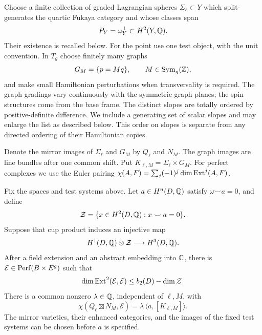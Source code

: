 Choose a finite collection of graded Lagrangian spheres $\Sigma_\ell\subset Y$
which split-generates the quartic Fukaya category and whose classes span
\begin{equation}
 P_Y=\omega_Y^\perp\subset H^2(Y,\mathbb Q).
 \label{setup:primitive-space}
\end{equation}
Their existence is recalled below.  For the point use one test object,
with the unit convention.  In $T_g$ choose finitely many graphs
\begin{equation}
 G_M=\{p=Mq\},\qquad M\in\operatorname{Sym}_g(\mathbb Z),
 \label{setup:graphs}
\end{equation}
and make small Hamiltonian perturbations when transversality is required.
The graph gradings vary continuously with the symmetric graph planes;
the spin structures come from the base frame.  The distinct slopes are
totally ordered by positive-definite difference.  We include a generating
set of scalar slopes and may enlarge the list as described below.
This order on slopes is separate from any directed ordering of their
Hamiltonian copies.

Denote the mirror images of $\Sigma_\ell$ and $G_M$ by $Q_\ell$ and $N_M$.
The graph images are line bundles after one common shift.  Put
$K_{\ell,M}=\Sigma_\ell\times G_M$.  For perfect complexes we use the Euler
pairing
$\chi(A,F)=\sum_j(-1)^j\dim\operatorname{Ext}^j(A,F)$.

\begin{proposition}
\label{prop:realization}
Fix the spaces and test systems above.  Let $a\in H^n(D,\mathbb Q)$ satisfy
$\omega\smile a=0$, and define
\[
 \mathcal Z=\{x\in H^2(D,\mathbb Q):x\smile a=0\}.
\]
Suppose that cup product induces an injective map
\begin{equation}
 H^1(D,\mathbb Q)\otimes\mathcal Z\longrightarrow H^3(D,\mathbb Q).
 \label{setup:wedge-injective}
\end{equation}
After a field extension and an abstract embedding into $\mathbb C$, there is
$\mathcal E\in\operatorname{Perf}(B\times E^g)$ such that
\begin{equation}
 \dim\operatorname{Ext}^2(\mathcal E,\mathcal E)
 \le b_2(D)-\dim\mathcal Z.
 \label{setup:ext-bound}
\end{equation}
There is a common nonzero $\lambda\in\mathbb Q$, independent of $\ell,M$, with
\begin{equation}
 \chi(Q_\ell\boxtimes N_M,\mathcal E)
   =\lambda\,\langle a,[K_{\ell,M}]\rangle.
 \label{setup:euler}
\end{equation}
The mirror varieties, their enhanced categories, and the images of the
fixed test systems can be chosen before $a$ is specified.
\end{proposition}

